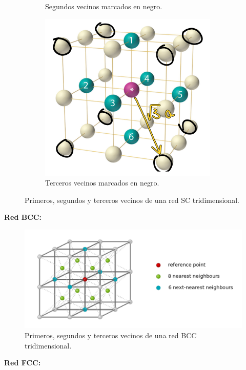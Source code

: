 \documentclass[a4paper]{article}
\begin{document}
\begin{figure}[H]
\begin{subfigure}[b]{0.4\linewidth}
    \caption{Segundos vecinos marcados en negro.}
  \end{subfigure}
  \begin{subfigure}[b]{0.4\linewidth}
    \includegraphics[width=\linewidth]{red3d_sc2.png}
    \caption{Terceros vecinos marcados en negro.}
  \end{subfigure}
  \caption{Primeros, segundos y terceros vecinos de una red SC tridimensional.}
  \label{fig:red3d_Sc}
\end{figure}

\textbf{Red BCC:}\\

\begin{figure}[H]
  \centering
  \includegraphics[width=0.7\linewidth,height=0.3\linewidth]{red3d_bcc.png}
  \caption{Primeros, segundos y terceros vecinos de una red BCC tridimensional.}
  \label{fig:red3d_bcc}
\end{figure}

\textbf{Red FCC:}\\
\end{document}
